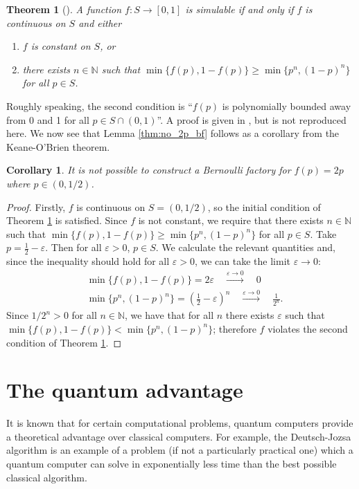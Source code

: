 \documentclass{article}
\newtheorem{thm}{Theorem}
\newtheorem{cor}{Corollary}
\theoremstyle{definition}
\begin{document}
\begin{thm}[\citet{keane1994}]\label{thm:KOB}
A function $f:S\to[0,1]$ is simulable if and only if $f$ is continuous on $S$ and either
\begin{enumerate}[label=(\alph*)]
\item $f$ is constant on $S$, or
\item there exists $n\in\mathbb{N}$ such that $\min\{f(p),1-f(p)\} \geq \min\{p^n, (1-p)^n\}$ for all $p\in S$.
\end{enumerate}
\end{thm}

Roughly speaking, the second condition is ``$f(p)$ is polynomially bounded away from 0 and 1 for all $p\in S\cap(0,1)$''. A proof is given in \citet{keane1994}, but is not reproduced here. We now see that Lemma \ref{thm:no_2p_bf} follows as a corollary from the Keane-O'Brien theorem.
\begin{cor}
It is not possible to construct a Bernoulli factory for $f(p)=2p$ where $p\in(0,1/2)$.
\end{cor}
\begin{proof}
Firstly, $f$ is continuous on $S=(0,1/2)$, so the initial condition of Theorem \ref{thm:KOB} is satisfied.
Since $f$ is not constant, we require that there exists $n\in\mathbb{N}$ such that $\min\{f(p),1-f(p)\} \geq \min\{p^n, (1-p)^n\}$ for all $p\in S$.
Take $p=\frac{1}{2} - \varepsilon$. Then for all $\varepsilon>0$, $p\in S$.
We calculate the relevant quantities and, since the inequality should hold for all $\varepsilon>0$,  we can take the limit $\varepsilon\to 0$:
\begin{align*}
&\min\{f(p),1-f(p)\} = 2\varepsilon \quad \overset{\varepsilon\to 0}{\longrightarrow}\quad 0 \\
&\min\{p^n, (1-p)^n\} = \left( \frac{1}{2} - \varepsilon \right)^n \quad \overset{\varepsilon\to 0}{\longrightarrow}\quad \frac{1}{2^n}.
\end{align*}
Since $1/2^n >0$ for all $n\in\mathbb{N}$, we have that for all $n$ there exists $\varepsilon$ such that $\min\{f(p),1-f(p)\} < \min\{p^n, (1-p)^n\}$; therefore $f$ violates the second condition of Theorem \ref{thm:KOB}.
\end{proof}

\section{The quantum advantage}\label{sec:quantum_advantage}
It is known that for certain computational problems, quantum computers provide a theoretical advantage over classical computers. For example, the Deutsch-Jozsa algorithm \citep{deutsch1992} is an example of a problem (if not a particularly practical one) which a quantum computer can solve in exponentially less time than the best possible classical algorithm.
\end{document}
